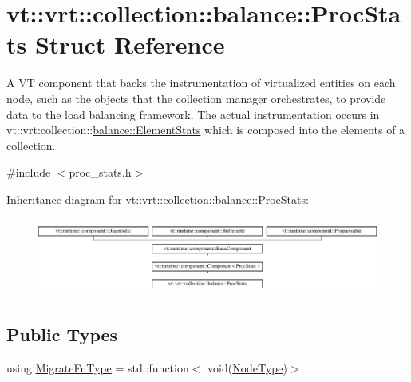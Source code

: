 \hypertarget{structvt_1_1vrt_1_1collection_1_1balance_1_1_proc_stats}{}\section{vt\+:\+:vrt\+:\+:collection\+:\+:balance\+:\+:Proc\+Stats Struct Reference}
\label{structvt_1_1vrt_1_1collection_1_1balance_1_1_proc_stats}


A VT component that backs the instrumentation of virtualized entities on each node, such as the objects that the collection manager orchestrates, to provide data to the load balancing framework. The actual instrumentation occurs in {\ttfamily vt\+::vrt\+:collection\+:}\+:\hyperlink{structvt_1_1vrt_1_1collection_1_1balance_1_1_element_stats}{balance\+::\+Element\+Stats} which is composed into the elements of a collection.  




{\ttfamily \#include $<$proc\+\_\+stats.\+h$>$}

Inheritance diagram for vt\+:\+:vrt\+:\+:collection\+:\+:balance\+:\+:Proc\+Stats\+:\begin{figure}[H]
\begin{center}
\leavevmode
\includegraphics[height=2.565865cm]{structvt_1_1vrt_1_1collection_1_1balance_1_1_proc_stats}
\end{center}
\end{figure}
\subsection*{Public Types}
\begin{DoxyCompactItemize}
\item 
using \hyperlink{structvt_1_1vrt_1_1collection_1_1balance_1_1_proc_stats_a7cb065ac4de218cb717bc2634782f0cb}{Migrate\+Fn\+Type} = std\+::function$<$ void(\hyperlink{namespacevt_a866da9d0efc19c0a1ce79e9e492f47e2}{Node\+Type})$>$
\end{DoxyCompactItemize}
